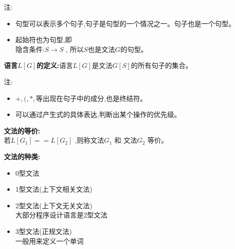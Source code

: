 \documentclass[UTF8,a4paper]{ctexart}
\newcommand{\spaceline}{\vspace{\baselineskip}}
\begin{document}
    注:
    \begin{itemize}
      \item 句型可以表示多个句子,句子是句型的一个情况之一。句子也是一个句型。
      \item 起始符也为句型,即\\
      隐含条件:$S\to S$ , 所以$S$也是文法$G$的句型。
    \end{itemize}

    \spaceline
    \textbf{语言$L[G]$的定义:}语言$L[G]$是文法$G[S]$的所有句子的集合。

    注:
    \begin{itemize}
      \item $+,(,*,$等出现在句子中的成分,也是终结符。
      \item 可以通过产生式的具体表达,判断出某个操作的优先级。
    \end{itemize}

    \spaceline
    \textbf{文法的等价:}\\
    若$L[G_1] == L[G_2]$ ,则称文法$G_1$ 和 文法$G_2$ 等价。

    \spaceline
    \textbf{文法的种类:}
    \begin{itemize}
      \item 0型文法
      \item 1型文法(上下文相关文法)
      \item 2型文法(上下文无关文法)\\
      大部分程序设计语言是2型文法
      \item 3型文法(正规文法)\\
      一般用来定义一个单词
    \end{itemize}
\end{document}
